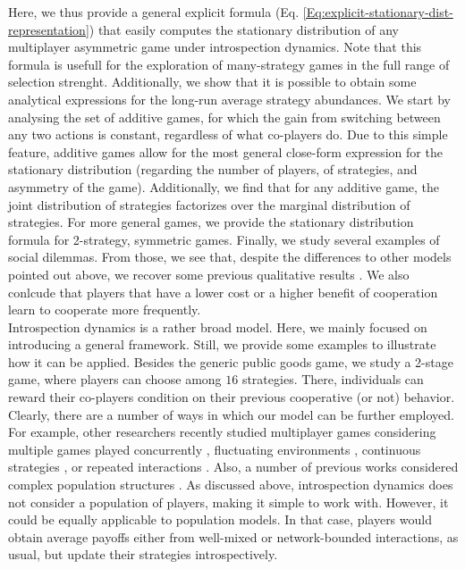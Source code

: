 \documentclass[11pt]{article}
\theoremstyle{plainCl1}
\theoremstyle{plainCl2}
\begin{document}

\noindent Here, we thus provide a general explicit formula (Eq. \ref{Eq:explicit-stationary-dist-representation}) that easily computes the stationary distribution of any multiplayer asymmetric game under introspection dynamics. Note that this formula is usefull for the exploration of many-strategy games in the full range of selection strenght.
Additionally, we show that it is possible to obtain some analytical expressions for the long-run average strategy abundances.
We start by analysing the set of additive games, for which the gain from switching between any two actions is constant, regardless of what co-players do. 
Due to this simple feature, additive games allow for the most general close-form expression for the stationary distribution (regarding the number of players, of strategies, and asymmetry of the game). 
Additionally, we find that for any additive game, the joint distribution of strategies factorizes over the marginal distribution of strategies. 
For more general games, we provide the stationary distribution formula for 2-strategy, symmetric games.
Finally, we study several examples of social dilemmas. From those, we see that, despite the differences to other models pointed out above, we recover some previous qualitative results \cite{Hauert:JTB:2006a}. We also conlcude that players that have a lower cost or a higher benefit of cooperation learn to cooperate more frequently. \\ 

\noindent Introspection dynamics is a rather broad model. Here, we mainly focused on introducing a general framework. Still, we provide some examples to illustrate how it can be applied. Besides the generic public goods game, we study a 2-stage game, where players can choose among $16$ strategies. There, individuals can reward their co-players condition on their previous cooperative (or not) behavior.
\noindent Clearly, there are a number of ways in which our model can be further employed. For example, other researchers recently studied multiplayer games considering multiple games played concurrently \cite{Venkateswaran:PRSB:2019}, fluctuating environments \cite{Baron:JRSOP:2018}, continuous strategies \cite{Molina:JMB:2017}, or repeated interactions \cite{Hilbe:JTB:2015}. Also, a number of previous works considered complex population structures \cite{Broom:JTB:2012, Wu:Games:2013, Perc:JRSI:2013, Pena:JTB:2015, Pena:JRSI:2016, Pattni:JTB:2017, Su:PNAS:2022}. As discussed above, introspection dynamics does not consider a population of players, making it simple to work with. However, it could be equally applicable to population models. In that case, players would obtain average payoffs either from well-mixed or network-bounded interactions, as usual, but update their strategies introspectively.
\end{document}
